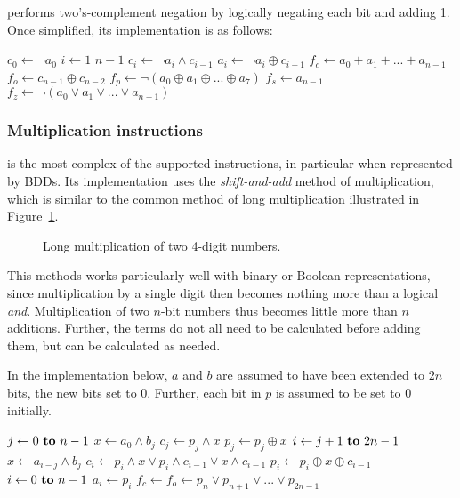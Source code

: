 \documentclass[a4paper,11pt]{kth-mag}
\renewcommand{\gets}{\leftarrow}
\newcommand{\AND}{\land}
\newcommand{\IOR}{\lor}
\newcommand{\XOR}{\oplus}
\newcommand{\NOT}{\lnot}
\begin{document}
 performs two's-complement negation by logically negating each bit and adding 1.
Once simplified, its implementation is as follows:

\begin{codebox}
\zi $c_0 \gets \NOT a_0$
\zi \For $i \gets 1$ \To $n-1$ \Do
\zi   $c_i \gets \NOT a_i \AND c_{i-1}$
\zi   $a_i \gets \NOT a_i \XOR c_{i-1}$ \End
\zi $f_c \gets a_0 + a_1 + ... + a_{n-1}$
\zi $f_o \gets c_{n-1} \XOR c_{n-2}$
\zi $f_p \gets \NOT(a_0 \XOR a_1 \XOR ... \XOR a_7)$
\zi $f_s \gets a_{n-1}$
\zi $f_z \gets \NOT(a_0 \IOR a_1 \IOR ... \IOR a_{n-1})$
\end{codebox}

\subsubsection{Multiplication instructions}

 is the most complex of the supported instructions, in particular when represented by BDDs.
Its implementation uses the \emph{shift-and-add} method of multiplication, which is similar to the common method of long multiplication illustrated in Figure~\ref{fig:long_multiplication}.

\begin{figure}
\centering

\caption{Long multiplication of two 4-digit numbers.}
\label{fig:long_multiplication}
\end{figure}

This methods works particularly well with binary or Boolean representations, since multiplication by a single digit then becomes nothing more than a logical \emph{and}.
Multiplication of two $n$-bit numbers thus becomes little more than $n$ additions.
Further, the terms do not all need to be calculated before adding them, but can be calculated as needed.

In the implementation below, $a$ and $b$ are assumed to have been extended to $2n$ bits, the new bits set to 0.
Further, each bit in $p$ is assumed to be set to 0 initially.


\begin{codebox}
\zi \For $j \gets 0 \To n-1$ \Do
\zi   $x \gets a_{0} \AND b_{j}$
\zi   $c_{j} \gets p_{j} \AND x$
\zi   $p_{j} \gets p_{j} \XOR x$
\zi   \For $i \gets j+1 \To 2n-1$ \Do
\zi     $x \gets a_{i-j} \AND b_{j}$
\zi     $c_{i} \gets p_{i} \AND x \IOR p_{i} \AND c_{i-1} \IOR x \AND c_{i-1}$
\zi     $p_{i} \gets p_{i} \XOR x \XOR c_{i-1}$ \End \End
\zi \For $i \gets 0 \To n-1$ \Do
\zi   $a_{i} \gets p_{i}$ \End
\zi $f_c \gets f_o \gets p_{n} \IOR p_{n+1} \IOR ... \IOR p_{2n-1}$
\end{codebox}
\end{document}

